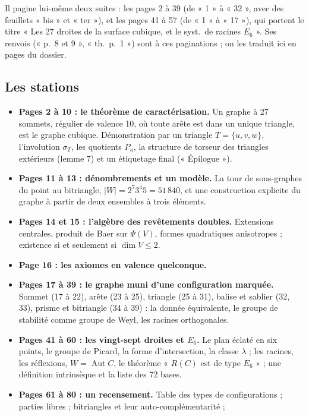 \documentclass[11pt,a4paper]{article}
\begin{document}
Il pagine lui-même deux suites : les pages 2 à 39 (de « 1 » à « 32 », avec des
feuillets « bis » et « ter »), et les pages 41 à 57 (de « 1 » à « 17 »), qui
portent le titre « Les 27 droites de la surface cubique, et le syst.\ de
racines $E_6$ ». Ses renvois (« p.~8 et 9 », « th.\ p.~1 ») sont à ces
paginations ; on les traduit ici en pages du dossier.

\subsection*{Les stations}

\begin{itemize}
\item \textbf{Pages 2 à 10 : le théorème de caractérisation.} Un graphe à 27
  sommets, régulier de valence 10, où toute arête est dans un unique
  triangle, est le graphe cubique. Démonstration par un triangle
  $T = \lbrace u, v, w \rbrace$, l'involution $\sigma_T$, les quotients $P_u$,
  la structure de torseur des triangles extérieurs (lemme 7) et un
  étiquetage final (« Épilogue »).
\item \textbf{Pages 11 à 13 : dénombrements et un modèle.} La tour de
  sous-graphes du point au bitriangle, $|W| = 2^7 3^4 5 = 51\,840$, et une
  construction explicite du graphe à partir de deux ensembles à trois
  éléments.
\item \textbf{Pages 14 et 15 : l'algèbre des revêtements doubles.}
  Extensions centrales, produit de Baer sur $\Psi(V)$, formes quadratiques
  anisotropes ; existence si et seulement si $\dim V \leq 2$.
\item \textbf{Page 16 : les axiomes en valence quelconque.}
\item \textbf{Pages 17 à 39 : le graphe muni d'une configuration marquée.}
  Sommet (17 à 22), arête (23 à 25), triangle (25 à 31), balise et sablier
  (32, 33), prisme et bitriangle (34 à 39) : la donnée équivalente, le groupe
  de stabilité comme groupe de Weyl, les racines orthogonales.
\item \textbf{Pages 41 à 60 : les vingt-sept droites et $E_6$.} Le plan
  éclaté en six points, le groupe de Picard, la forme d'intersection, la
  classe $\lambda$ ; les racines, les réflexions, $W = \operatorname{Aut} C$,
  le théorème « $R(C)$ est de type $E_6$ » ; une définition intrinsèque et la
  liste des 72 bases.
\item \textbf{Pages 61 à 80 : un recensement.} Table des types de
  configurations ; parties libres ; bitriangles et leur auto-complémentarité ;

\end{itemize}
\end{document}
